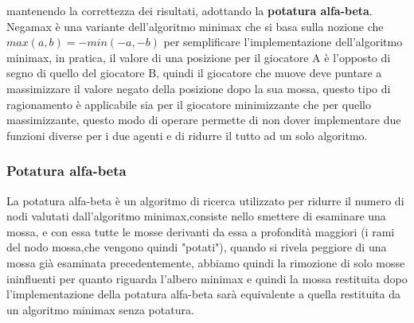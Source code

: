 mantenendo la correttezza dei risultati, adottando la \textbf{potatura alfa-beta}.
\\Negamax è una variante dell'algoritmo minimax che si basa sulla nozione che $max(a,b)= -min(-a,-b)$ per semplificare l'implementazione dell'algoritmo minimax,
in pratica, il valore di una posizione per il giocatore A è l'opposto di segno di quello del giocatore B, quindi il giocatore che muove deve puntare a massimizzare il valore negato della posizione
dopo la sua mossa, questo tipo di ragionamento è applicabile sia per il giocatore minimizzante che per quello massimizzante, questo modo di operare permette di non dover implementare due funzioni diverse per i due agenti 
e di ridurre il tutto ad un solo algoritmo.



\subsubsection{Potatura alfa-beta}
La potatura alfa-beta è un algoritmo di ricerca utilizzato per ridurre il numero di nodi valutati dall'algoritmo 
minimax,consiste nello smettere di esaminare una mossa, e con essa tutte le mosse derivanti da essa a profondità maggiori
(i rami del nodo mossa,che vengono quindi "potati"), quando si rivela peggiore di una mossa già esaminata precedentemente,
abbiamo quindi la rimozione di solo mosse ininfluenti per quanto riguarda l'albero minimax e quindi la mossa
restituita dopo l'implementazione della potatura alfa-beta sarà equivalente a quella restituita da un algoritmo
minimax senza potatura.


